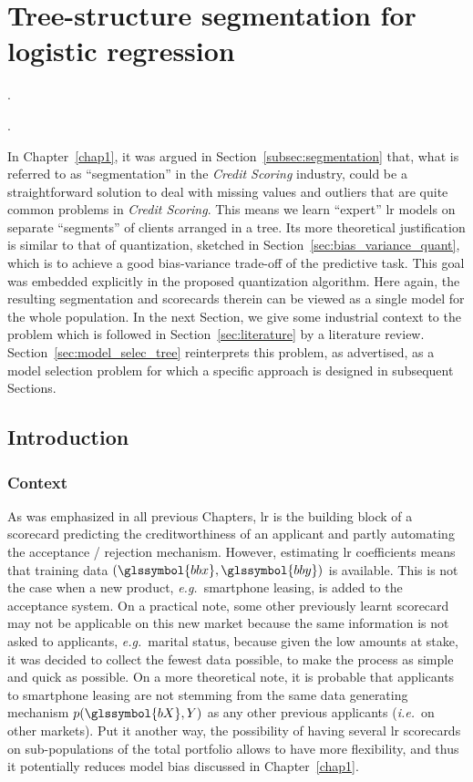 \chapter{Tree-structure segmentation for logistic regression} \label{chap6}


\epigraph{.}{.}

\minitoc

\bigskip

In Chapter~\ref{chap1}, it was argued in Section~\ref{subsec:segmentation} that, what is referred to as ``segmentation'' in the \textit{Credit Scoring} industry, could be a straightforward solution to deal with missing values and outliers that are quite common problems in \textit{Credit Scoring}. This means we learn ``expert'' \gls{lr} models on separate ``segments'' of clients arranged in a tree. Its more theoretical justification is similar to that of quantization, sketched in Section~\ref{sec:bias_variance_quant}, which is to achieve a good bias-variance trade-off of the predictive task. This goal was embedded explicitly in the proposed quantization algorithm. Here again, the resulting segmentation and scorecards therein can be viewed as a single model for the whole population. In the next Section, we give some industrial context to the problem which is followed in Section~\ref{sec:literature} by a literature review. Section~\ref{sec:model_selec_tree} reinterprets this problem, as advertised, as a model selection problem for which a specific approach is designed in subsequent Sections.


\section{Introduction}

\subsection{Context} \label{subsec:context}

As was emphasized in all previous Chapters, \gls{lr} is the building block of a scorecard predicting the creditworthiness of an applicant and partly automating the acceptance / rejection mechanism. However, estimating \gls{lr} coefficients means that training data $(\glssymbol{bbx},\glssymbol{bby})$ is available. This is not the case when a new product, \textit{e.g.}\ smartphone leasing, is added to the acceptance system. On a practical note, some other previously learnt scorecard may not be applicable on this new market because the same information is not asked to applicants, \textit{e.g.}\ marital status, because given the low amounts at stake, it was decided to collect the fewest data possible, to make the process as simple and quick as possible. On a more theoretical note, it is probable that applicants to smartphone leasing are not stemming from the same data generating mechanism $p(\glssymbol{bX},Y)$ as any other previous applicants (\textit{i.e.}\ on other markets). Put it another way, the possibility of having several \gls{lr} scorecards on sub-populations of the total portfolio allows to have more flexibility, and thus it potentially reduces model bias discussed in Chapter~\ref{chap1}.

